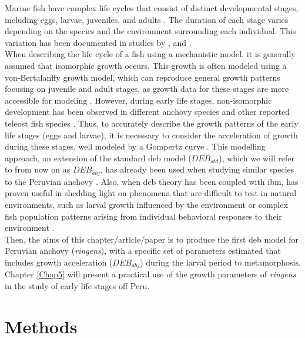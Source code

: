Marine fish have complex life cycles that consist of distinct developmental stages, including eggs, larvae, juveniles, and adults \citep{Pepi1991,LikaKooi2014}. The duration of each stage varies depending on the species and the environment surrounding each individual. This variation has been documented in studies by \cite{GreeFish2004}, and \cite{FontSant2011}.\\

When describing the life cycle of a fish using a mechanistic model, it is generally assumed that isomorphic growth occurs. This growth is often modeled using a von-Bertalanffy growth model, which can reproduce general growth patterns focusing on juvenile and adult stages, as growth data for these stages are more accessible for modeling \citep{VonB1957,MarzShin2009}. However, during early life stages, non-isomorphic development has been observed in different anchovy species \citep{PaloMora1988,TakaWata2001,MoreClar2011} and other reported teleost fish species \citep{KlinFros1991,OsseVan1995,LikaKooi2014}. Thus, to accurately describe the growth patterns of the early life stages (eggs and larvae), it is necessary to consider the acceleration of growth during these stages, well modeled by a Gompertz curve \citep{Gomp1825,KooiPecq2011}. This modelling approach, an extension of the standard \acrshort{deb} model ($DEB_{std}$), which we will refer to from now on as $DEB_{abj}$, has already been used when studying similar species to the Peruvian anchovy \citep{PecqPeti2009,GattPeti2017,MenuPecq2023}. Also, when \acrshort{deb} theory has been coupled with \acrshort{ibm}, has proven useful in shedding light on phenomena that are difficult to test in natural environments, such as larval growth influenced by the environment \citep{MartZimm2012,DaviJoac2019,BuenPeti2020,FlorLett2023} or complex fish population patterns arising from individual behavioral responses to their environment \citep{MartJage2013,BeauGous2015,BrocAuge2018,LiuZhan2023}.\\

Then, the aims of this chapter/article/paper is to produce the first \acrshort{deb} model for Peruvian anchovy (\textit{\gls{ringens}}), with a specific set of parameters estimated  that includes growth acceleration ($DEB_{abj}$) during the larval period to metamorphosis. Chapter \ref{Chap5} will present a practical use of the growth parameters of \textit{\gls{ringens}} in the study of early life stages off Peru.\\

\clearpage
\section{Methods}\label{Chap4Meth}


